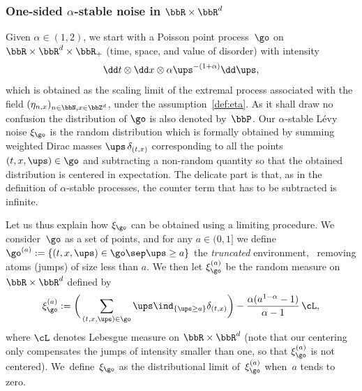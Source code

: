 \subsubsection*{One-sided $\alpha$-stable noise in $\bbR\times \bbR^d$}
Given $\alpha\in(1,2)$, we start with a Poisson
point process~$\go$ on $\bbR\times \bbR^d\times \bbR_+$ (time, space, and value of disorder) with intensity
\begin{equation}
\label{Poissondens}
\dd t \otimes \dd x \otimes \alpha \ups^{-(1+\alpha)} \dd \ups,
\end{equation}
which is obtained as the scaling limit of the extremal process associated with the field $(\eta_{n,x})_{n \in \bbN, x\in \bbZ^d}$, under the assumption~\eqref{def:eta}.
As it shall draw no confusion the distribution of $\go$ is also denoted by~$\bbP$.
Our $\alpha$-stable Lévy noise $\xi_{\go}$ is the random distribution which is formally obtained by summing weighted Dirac masses $\ups\,\delta_{(t,x)}$ corresponding to all the points $(t,x,\ups)\in \go$ and subtracting a non-random quantity so that the obtained distribution is centered in expectation. The delicate part is that, as in the definition of $\alpha$-stable processes, the counter term that has to be subtracted is infinite.

Let us thus explain how $\xi_{\go}$ can be obtained using a limiting procedure.
We consider~$\go$ as a set of points, and for any $a\in(0,1]$ we define $\go^{(a)}:=\{ (t,x,\ups)\in \go \sep \ups\ge a\}$ the \emph{truncated} environment, \ie \ removing atoms (jumps) of size less than $a$.
We then let $\xi_{\go}^{(a)}$ be the random measure on $\bbR\times \bbR^d$ defined by
\begin{equation}
\label{def:omegabar}
\xi_{\go}^{(a)}:= \bigg(\sum_{(t,x,\ups)\in \go} \ups\ind_{\{\ups \ge a\}} \delta_{(t,x)} \bigg)- \frac{ \alpha (a^{1-\alpha}-1)}{\alpha-1} \, \cL,
\end{equation}
where $\cL$ denotes Lebesgue measure on $\bbR\times \bbR^d$
(note that our centering only compensates the jumps of intensity smaller than one, so that $\xi_{\go}^{(a)}$ is
not centered).
We~de\-fine~$\xi_{\go}$ as the distributional limit of~$ \xi_{\go}^{(a)}$ when~$a$ tends to zero.

